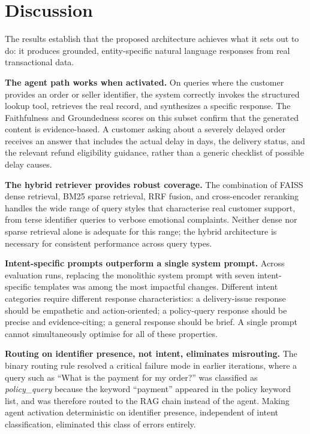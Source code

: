 \documentclass[conference]{IEEEtran}
\begin{document}
\section{Discussion}

The results establish that the proposed architecture achieves what it sets out to
do: it produces grounded, entity-specific natural language responses from real
transactional data.

\textbf{The agent path works when activated.} On queries where the customer
provides an order or seller identifier, the system correctly invokes the structured
lookup tool, retrieves the real record, and synthesizes a specific response.
The Faithfulness and Groundedness scores on this subset confirm that the generated
content is evidence-based. A customer asking about a severely delayed order
receives an answer that includes the actual delay in days, the delivery status,
and the relevant refund eligibility guidance, rather than a generic checklist of
possible delay causes.

\textbf{The hybrid retriever provides robust coverage.} The combination of FAISS
dense retrieval, BM25 sparse retrieval, RRF fusion, and cross-encoder reranking
handles the wide range of query styles that characterise real customer support,
from terse identifier queries to verbose emotional complaints. Neither dense nor
sparse retrieval alone is adequate for this range; the hybrid architecture is
necessary for consistent performance across query types.

\textbf{Intent-specific prompts outperform a single system prompt.} Across
evaluation runs, replacing the monolithic system prompt with seven intent-specific
templates was among the most impactful changes. Different intent categories require
different response characteristics: a delivery-issue response should be empathetic
and action-oriented; a policy-query response should be precise and evidence-citing;
a general response should be brief. A single prompt cannot simultaneously optimise
for all of these properties.

\textbf{Routing on identifier presence, not intent, eliminates misrouting.} The
binary routing rule resolved a critical failure mode in earlier iterations, where
a query such as ``What is the payment for my order?'' was classified as
\textit{policy\_query} because the keyword ``payment'' appeared in the policy
keyword list, and was therefore routed to the RAG chain instead of the agent.
Making agent activation deterministic on identifier presence, independent of intent
classification, eliminated this class of errors entirely.
\end{document}
